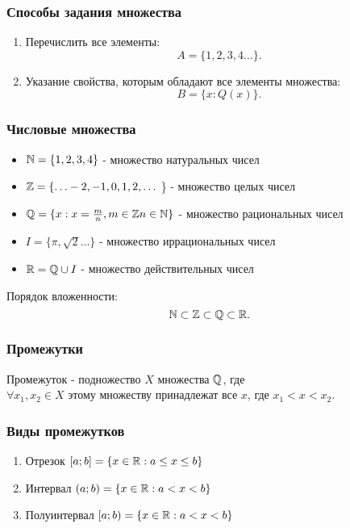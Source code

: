 \subsubsection{Способы задания множества}

\begin{enumerate}
  \item Перечислить все элементы:
   \[
  A = \{1, 2, 3, 4 \ldots\} 
  .\] 
  \item Указание свойства, которым обладают все элементы множества:
  \[
  B = \{x : Q(x)\} 
  .\] 
\end{enumerate}

\subsubsection{Числовые множества}
\begin{itemize}
  \item $\mathbb{N} = \{1, 2, 3, 4\} $ - множество натуральных чисел
  \item $\mathbb{Z} = \{ \ldots -2, -1, 0, 1, 2, \ldots$ \} - множество целых чисел
  \item $\mathbb{Q} = \{x : x = \frac{m}{n}, m\in \mathbb{Z} n\in \mathbb{N}\} $ - множество рациональных чисел
  \item $I = \{\pi, \sqrt{2}\ldots \} $ - множество иррациональных чисел
  \item $\mathbb{R} = \mathbb{Q} \cup I $ - множество действительных чисел
\end{itemize}
\begin{note}
  Порядок вложенности:
  \[
  \mathbb{N} \subset \mathbb{Z} \subset \mathbb{Q} \subset \mathbb{R}
  .\] 
\end{note}

\subsubsection*{Промежутки}
\begin{definition}
  Промежуток - подножество $X$ множества $\mathbb{Q}$, где \\ $\forall x_1, x_2\in X$ этому множеству принадлежат все $x$, где $x_1 < x < x_2$.
\end{definition}

\subsubsection{Виды промежутков}
\begin{enumerate}
  \item Отрезок $[a;b] = \{x\in \mathbb{R} : a \le x \le b\} $
  \item Интервал $(a; b) = \{x\in \mathbb{R} : a < x < b\} $
  \item Полуинтервал $[a; b) = \{x\in \mathbb{R}: a < x < b\} $
\end{enumerate}

